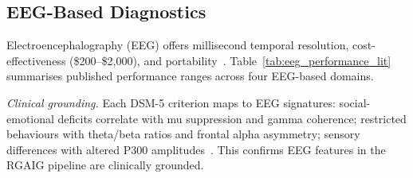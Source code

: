 \subsection{EEG-Based Diagnostics}

Electroencephalography (EEG) offers millisecond temporal resolution, cost-effectiveness (\$200--\$2,000), and portability~\cite{niedermeyer2005eeg}. Table~\ref{tab:eeg_performance_lit} summarises published performance ranges across four EEG-based domains.

%

\textit{Clinical grounding.} Each DSM-5 criterion maps to EEG signatures: social-emotional deficits correlate with mu suppression and gamma coherence; restricted behaviours with theta/beta ratios and frontal alpha asymmetry; sensory differences with altered P300 amplitudes~\cite{asthana2025asd_review}. This confirms EEG features in the RGAIG pipeline are clinically grounded.

